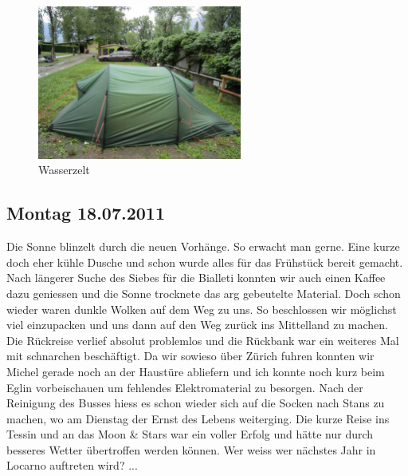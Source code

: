 \begin{figure}[H]
    \centering
    \includegraphics[width=0.6\textwidth]{../Bilder/Locarno/5.jpg}
    \caption{Wasserzelt}
    \label{img:MoonandStars}
\end{figure}

\subsection{Montag 18.07.2011}
Die Sonne blinzelt durch die neuen Vorhänge.
So erwacht man gerne.
Eine kurze doch eher kühle Dusche und schon wurde alles für das Frühstück bereit gemacht.
Nach längerer Suche des Siebes für die Bialleti konnten wir auch einen Kaffee dazu geniessen und die Sonne trocknete das arg gebeutelte Material.
Doch schon wieder waren dunkle Wolken auf dem Weg zu uns.
So beschlossen wir möglichst viel einzupacken und uns dann auf den Weg zurück ins Mittelland zu machen.
Die Rückreise verlief absolut problemlos und die Rückbank war ein weiteres Mal mit schnarchen beschäftigt.
Da wir sowieso über Zürich fuhren konnten wir Michel gerade noch an der Haustüre abliefern und ich konnte noch kurz beim Eglin vorbeischauen um fehlendes Elektromaterial zu besorgen.
Nach der Reinigung des Busses hiess es schon wieder sich auf die Socken nach Stans zu machen, wo am Dienstag der Ernst des Lebens weiterging.
Die kurze Reise ins Tessin und an das Moon \& Stars war ein voller Erfolg und hätte nur durch besseres Wetter übertroffen werden können.
Wer weiss wer nächstes Jahr in Locarno auftreten wird? ...
